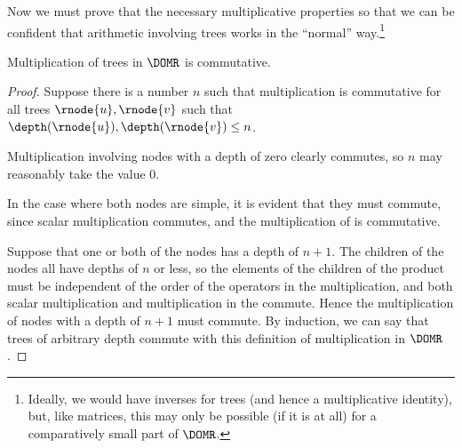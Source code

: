 Now we must prove that the necessary multiplicative properties so that
we can be confident that arithmetic involving trees works in the
``normal'' way.\footnote{Ideally, we would have inverses for trees
  (and hence a multiplicative identity), but, like matrices, this may
  only be possible (if it is at all) for a comparatively small part of
  $\DOMR$.} 

\begin{proposition}\label{TMcommutativity}
Multiplication of trees in $\DOMR$ is commutative.
\begin{proof}
  Suppose there is a number $n$ such that multiplication is
  commutative for all trees $\rnode{u}, \rnode{v}$ such that
  $\depth(\rnode{u}), \depth(\rnode{v}) \le n$.

  Multiplication involving nodes with a depth of zero clearly
  commutes, so $n$ may reasonably take the value 0.

  In the case where both nodes are simple, it is evident that
  they must commute, since scalar multiplication commutes, and the
  multiplication of \polytypes is commutative.

  Suppose that one or both of the nodes has a depth of $n+1$. The
  children of the nodes all have depths of $n$ or less, so the
  elements of the children of the product must be independent of
  the order of the operators in the multiplication, and both scalar
  multiplication and multiplication in the \polytypes  commute.  Hence the
  multiplication of nodes with a depth of $n+1$ must commute.  By
  induction, we can say that trees of arbitrary depth commute with
  this definition of multiplication in $\DOMR$.
  \end{proof}
\end{proposition}

